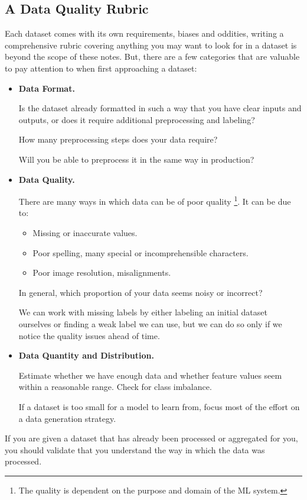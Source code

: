 \subsection{A Data Quality Rubric}
Each dataset comes with its own requirements, biases and oddities,
writing a comprehensive rubric covering anything you may
want to look for in a dataset is beyond the scope of these notes.
But, there are a few categories that are valuable to pay attention
to when first approaching a dataset:
\begin{itemize}
    \item \textbf{Data Format.}
    
    \noindent
    Is the dataset already formatted in such a way that you have
    clear inputs and outputs, or does it require additional
    preprocessing and labeling?

    How many preprocessing steps does your data require?

    Will you be able to preprocess it in the same way in production?


    \item \textbf{Data Quality.}
    
    \noindent
    There are many ways in which data can be of poor quality
    \footnote{
        The quality is dependent on the purpose and domain
        of the ML system.
    }.
    It can be due to:
    \begin{itemize}
        \item Missing or inaccurate values.
    
        \item Poor spelling, many special or incomprehensible
        characters.
        
        \item Poor image resolution, misalignments.
    \end{itemize}
    In general, which proportion of your data seems noisy or
    incorrect?

    We can work with missing labels by either labeling an initial
    dataset ourselves or finding a weak label we can use, but we
    can do so only if we notice the quality issues ahead of time.


    \item \textbf{Data Quantity and Distribution.}
    
    \noindent
    Estimate whether we have enough data and whether feature
    values seem within a reasonable range.
    Check for class imbalance.

    If a dataset is too small for a model to learn from, focus
    most of the effort on a data generation strategy.


\end{itemize}
If you are given a dataset that has already been processed or
aggregated for you, you should validate that you understand
the way in which the data was processed.



